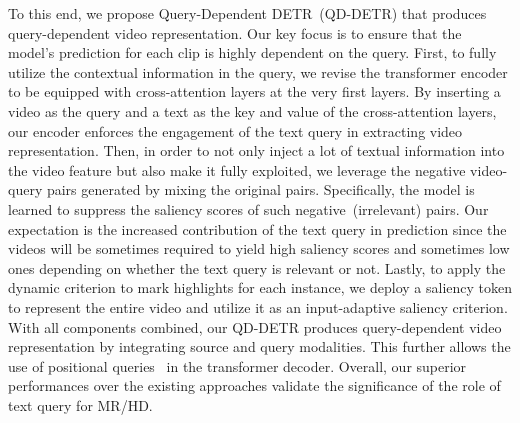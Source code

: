 To this end, we propose Query-Dependent DETR~(QD-DETR) that produces query-dependent video representation.
Our key focus is to ensure that the model's prediction for each clip is highly dependent on the query.
First, to fully utilize the contextual information in the query, we revise the transformer encoder to be equipped with cross-attention layers at the very first layers.
By inserting a video as the query and a text as the key and value of the cross-attention layers, our encoder enforces the engagement of the text query in extracting video representation.
Then, in order to not only inject a lot of textual information into the video feature but also make it fully exploited, we leverage the negative video-query pairs generated by mixing the original pairs.
Specifically, the model is learned to suppress the saliency scores of such  negative~(irrelevant) pairs.
Our expectation is the increased contribution of the text query in prediction since the videos will be sometimes required to yield high saliency scores and sometimes low ones depending on whether the text query is relevant or not.
Lastly, to apply the dynamic criterion to mark highlights for each instance, we deploy a saliency token to represent the entire video and utilize it as an input-adaptive saliency criterion. 
With all components combined, our QD-DETR produces query-dependent video representation by integrating source and query modalities.
This further allows the use of positional queries~\cite{dabdetr} in the transformer decoder.
Overall, our superior performances over the existing approaches validate the significance of the role of text query for MR/HD.





























%
